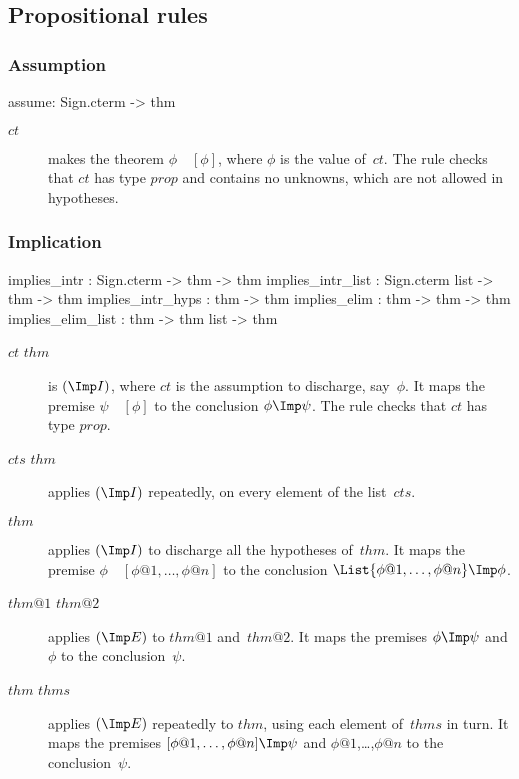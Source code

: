 \subsection{Propositional rules}
\subsubsection{Assumption}
\begin{ttbox} 
assume: Sign.cterm -> thm
\end{ttbox}
\begin{description}
\item[ $ct$] 
makes the theorem \(\phi \quad[\phi]\), where $\phi$ is the value of~$ct$.
The rule checks that $ct$ has type $prop$ and contains no unknowns, which
are not allowed in hypotheses.
\end{description}

\subsubsection{Implication}
\begin{ttbox} 
implies_intr      : Sign.cterm -> thm -> thm
implies_intr_list : Sign.cterm list -> thm -> thm
implies_intr_hyps : thm -> thm
implies_elim      : thm -> thm -> thm
implies_elim_list : thm -> thm list -> thm
\end{ttbox}
\begin{description}
\item[ $ct$ $thm$] 
is $({\Imp}I)$, where $ct$ is the assumption to discharge, say~$\phi$.  It
maps the premise $\psi\quad[\phi]$ to the conclusion $\phi\Imp\psi$.  The
rule checks that $ct$ has type $prop$.

\item[ $cts$ $thm$] 
applies $({\Imp}I)$ repeatedly, on every element of the list~$cts$.

\item[ $thm$] 
applies $({\Imp}I)$ to discharge all the hypotheses of~$thm$.  It maps the
premise $\phi \quad [\phi@1,\ldots,\phi@n]$ to the conclusion
$\List{\phi@1,\ldots,\phi@n}\Imp\phi$.

\item[ $thm@1$ $thm@2$] 
applies $({\Imp}E)$ to $thm@1$ and~$thm@2$.  It maps the premises $\phi\Imp
\psi$ and $\phi$ to the conclusion~$\psi$.

\item[ $thm$ $thms$] 
applies $({\Imp}E)$ repeatedly to $thm$, using each element of~$thms$ in
turn.  It maps the premises $[\phi@1,\ldots,\phi@n]\Imp\psi$ and
$\phi@1$,\ldots,$\phi@n$ to the conclusion~$\psi$.
\end{description}

